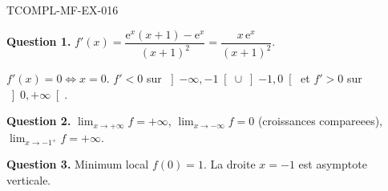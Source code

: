 \begin{corrige}{TCOMPL-MF-EX-016}

\textbf{Question 1.} $f'(x) = \dfrac{\mathrm{e}^x(x+1) - \mathrm{e}^x}{(x+1)^2} = \dfrac{x\,\mathrm{e}^x}{(x+1)^2}$.


$f'(x) = 0 \iff x = 0$. $f' < 0$ sur $\left]-\infty, -1\right[ \cup \left]-1, 0\right[$ et $f' > 0$ sur $\left]0, +\infty\right[$.

\textbf{Question 2.} $\lim_{x \to +\infty} f = +\infty$, $\lim_{x \to -\infty} f = 0$ (croissances compareees), $\lim_{x \to -1^+} f = +\infty$.

\textbf{Question 3.} Minimum local $f(0) = 1$. La droite $x = -1$ est asymptote verticale.

\end{corrige}
